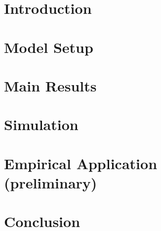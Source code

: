 \documentclass[a4paper]{article}
\begin{document}
\section{Introduction}

\section{Model Setup}

\section{Main Results}

\section{Simulation}

\section{Empirical Application (preliminary)}

\section{Conclusion}




\begin{appendices}

\end{appendices}
\end{document}
